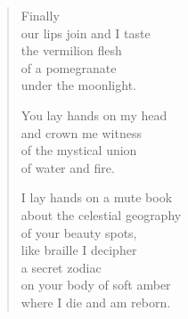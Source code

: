 \documentclass[twocolumn,11pt]{article}
\begin{document}
\begin{verse}
  Finally \\
  our lips join and I taste \\
  the vermilion flesh\\
  of a pomegranate \\
  under the moonlight.

  You lay hands on my head \\
  and crown me witness \\
  of the mystical union \\
  of water and fire.

  I lay hands on a mute book \\
  about the celestial geography \\
  of your beauty spots, \\
  like braille I decipher \\
  a secret zodiac \\
  on your body of soft amber \\
  where I die and am reborn.
\end{verse}
\end{document}
